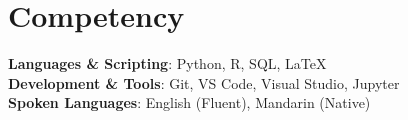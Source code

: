 \documentclass[a4paper,11pt]{article}
\begin{document}
%
\section{Competency}
 \begin{itemize}[leftmargin=0.15in, label={}]
    \small{\item{
     \textbf{Languages \& Scripting}{: Python, R, SQL, LaTeX} \\
     \textbf{Development \& Tools}{: Git, VS Code, Visual Studio, Jupyter} \\
     \textbf{Spoken Languages}{: English (Fluent), Mandarin (Native)}
    }}
 \end{itemize}


\end{document}
